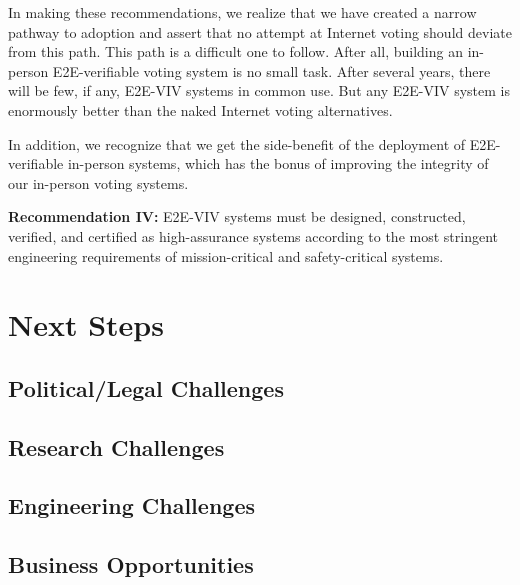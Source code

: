 In making these recommendations, we realize that we have created a
narrow pathway to adoption and assert that no attempt at Internet
voting should deviate from this path.  This path is a difficult one to
follow.  After all, building an in-person E2E-verifiable voting system
is no small task.  After several years, there will be few, if any,
E2E-VIV systems in common use.  But any E2E-VIV system is enormously
better than the naked Internet voting alternatives.  

In addition, we recognize that we get the side-benefit of the
deployment of E2E-verifiable in-person systems, which has the bonus of
improving the integrity of our in-person voting systems.

\begin{center}
  \textbf{Recommendation IV:} E2E-VIV systems must be designed,
  constructed, verified, and certified as high-assurance systems
  according to the most stringent engineering requirements of
  mission-critical and safety-critical systems.
\end{center}

\section{Next Steps}
\label{sec:next-steps}

\subsection{Political/Legal Challenges}
\subsection{Research Challenges}
\subsection{Engineering Challenges}
\subsection{Business Opportunities}
